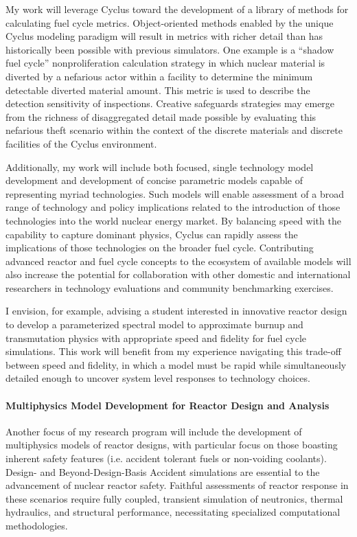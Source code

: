 \documentclass[a4paper, 10pt]{article}
\begin{document}
My work will leverage Cyclus toward the development of a library 
of methods for calculating fuel cycle metrics.  Object-oriented methods enabled 
by the unique Cyclus modeling paradigm will result in metrics with richer detail 
than has historically been possible with previous simulators. One example is a 
``shadow fuel cycle'' nonproliferation calculation strategy in which nuclear material is 
diverted by a nefarious actor within a facility to determine the minimum 
detectable diverted material amount.  This metric is used to describe the 
detection sensitivity of inspections.  Creative safeguards strategies may emerge 
from the richness of disaggregated detail made possible by evaluating this 
nefarious theft scenario within the context of the discrete materials and 
discrete facilities of the Cyclus environment.

Additionally, my work will include both focused, single technology model development and 
development of concise parametric models capable of representing myriad 
technologies.  Such models will enable assessment of a broad range of technology 
and policy implications related to the introduction of those technologies into 
the world nuclear energy market. By balancing speed with the capability to 
capture dominant physics, Cyclus can rapidly assess the implications of those 
technologies on the broader fuel cycle.  Contributing advanced reactor and fuel 
cycle concepts to the ecosystem of available models will also increase the 
potential for collaboration with other domestic and international researchers in 
technology evaluations and community benchmarking exercises.

I envision, for example, advising a student interested in innovative reactor 
design to develop a parameterized spectral model to approximate burnup and 
transmutation physics with appropriate speed and fidelity for fuel cycle 
simulations.  This work will benefit from my experience navigating this 
trade-off between speed and fidelity, in which a model must be rapid while 
simultaneously detailed enough to uncover system level responses to technology 
choices.


\paragraph{Multiphysics Model Development for Reactor Design and Analysis}

Another focus of my research program will include the development of 
multiphysics models of reactor designs, with particular focus on those boasting 
inherent safety features (i.e. accident tolerant fuels or non-voiding coolants).  
Design- and Beyond-Design-Basis Accident simulations are essential to the 
advancement of nuclear reactor safety. Faithful assessments of reactor response 
in these scenarios require fully coupled, transient simulation of neutronics, 
thermal hydraulics, and structural performance, necessitating specialized 
computational methodologies. 
\end{document}
